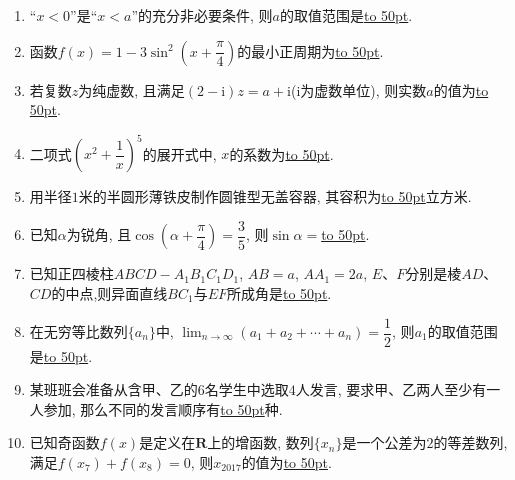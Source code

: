 \documentclass[10pt,a4paper]{article}
\newcommand{\blank}[1]{\underline{\hbox to #1pt{}}}
\begin{document}
\begin{enumerate}[1.]
\item ``$x<0$''是``$x<a$''的充分非必要条件, 则$a$的取值范围是\blank{50}.
\item 函数$f(x)=1-3\sin ^2(x+\dfrac\pi 4)$的最小正周期为\blank{50}.
\item 若复数$z$为纯虚数, 且满足$(2-\mathrm{i})z=a+\mathrm{i}$($\mathrm{i}$为虚数单位), 则实数$a$的值为\blank{50}.
\item 二项式$(x^2+\dfrac 1x)^5$的展开式中, $x$的系数为\blank{50}.
\item 用半径$1$米的半圆形薄铁皮制作圆锥型无盖容器, 其容积为\blank{50}立方米.
\item 已知$\alpha$为锐角, 且$\cos (\alpha +\dfrac\pi 4)=\dfrac35$, 则$\sin \alpha =$\blank{50}.
\item 已知正四棱柱$ABCD-A_1B_1C_1D_1$, $AB=a$, $AA_1=2a$, $E$、$F$分别是棱$AD$、$CD$的中点,则异面直线$BC_1$与$EF$所成角是\blank{50}.
\item 在无穷等比数列$\{a_n\}$中, $\displaystyle\lim_{n\to\infty}(a_1+a_2+\cdots+a_n)=\dfrac12$, 则$a_1$的取值范围是\blank{50}.
\item 某班班会准备从含甲、乙的$6$名学生中选取$4$人发言, 要求甲、乙两人至少有一人参加, 那么不同的发言顺序有\blank{50}种.
\item 已知奇函数$f(x)$是定义在$\mathbf{R}$上的增函数, 数列$\{x_n\}$是一个公差为$2$的等差数列, 满足$f(x_7)+f(x_8)=0$, 则$x_{2017}$的值为\blank{50}.



\end{enumerate}
\end{document}

